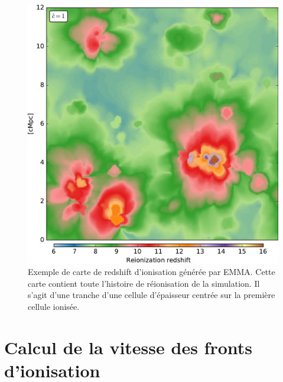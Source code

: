 \begin{figure}
        \includegraphics[width=.95\linewidth]{img/04_mapreio/map_z_c1.pdf} 
        \caption[Carte de redshifts d'ionisation]{Exemple de carte de redshift d'ionisation générée par EMMA.
        Cette carte contient toute l'histoire de réionisation de la simulation.
        Il s'agit d'une tranche d'une cellule d'épaisseur centrée sur la première cellule ionisée.
 		\label{fig:zmap}}
\end{figure}


\section{Calcul de la vitesse des fronts d’ionisation}
\label{sec:vreio}

